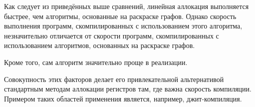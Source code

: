 Как следует из приведённых выше сравнений, линейная аллокация выполняется быстрее, чем алгоритмы,
основанные на раскраске графов.
Однако скорость выполнения программ, скомпилированных с использованием
этого алгоритма, незначительно отличается от скорости программ,
скомпилированных с использованием алгоритмов,
основанных на раскраске графов.

Кроме того, сам алгоритм значительно проще в реализации.

Совокупность этих факторов делает его привлекательной альтернативой стандартным методам аллокации регистров там,
где важна скорость компиляции.
Примером таких областей применения является, например, джит-компиляция.
